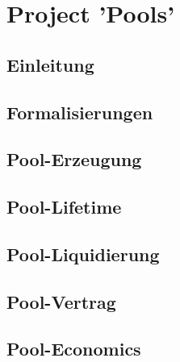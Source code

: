
\section{Project 'Pools'}
\label{sec:pools}

\subsection{Einleitung}
\label{sec:pools-einleitung}
\vspace{0.3cm}


\subsection{Formalisierungen}
\vspace{0.3cm}


\subsection{Pool-Erzeugung}
\vspace{0.3cm}


\subsection{Pool-Lifetime}
\vspace{0.3cm}


\subsection{Pool-Liquidierung}
\vspace{0.3cm}


\subsection{Pool-Vertrag}
\vspace{0.3cm}


\subsection{Pool-Economics}
\vspace{0.3cm}






